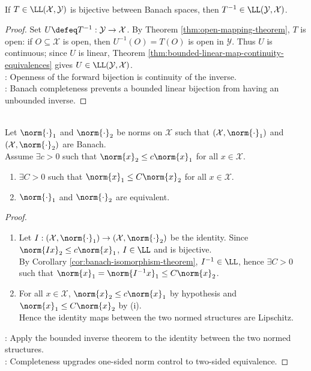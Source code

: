 \begin{corollary} \label{cor:banach-isomorphism-theorem} \\
If $T\in\LL(\mathcal{X},\mathcal{Y})$ is bijective between Banach spaces, then $T^{-1}\in\LL(\mathcal{Y},\mathcal{X})$.
\begin{proof}
Set $U\defeq T^{-1}:\mathcal Y\to\mathcal X$. By Theorem \ref{thm:open-mapping-theorem}, $T$ is open: if $O\subseteq\mathcal X$ is open, then $U^{-1}(O)=T(O)$ is open in $\mathcal Y$. Thus $U$ is continuous; since $U$ is linear, Theorem \ref{thm:bounded-linear-map-continuity-equivalences} gives $U\in\LL(\mathcal Y,\mathcal X)$.\\
: Openness of the forward bijection is continuity of the inverse.\\
: Banach completeness prevents a bounded linear bijection from having an unbounded inverse.
\end{proof}
\end{corollary}

\begin{corollary} \label{cor:banach-equivalent-norms-one-sided} \\
Let $\norm{\cdot}_1$ and $\norm{\cdot}_2$ be norms on $\mathcal X$ such that $(\mathcal X,\norm{\cdot}_1)$ and $(\mathcal X,\norm{\cdot}_2)$ are Banach.\\
Assume $\exists c>0$ such that $\norm{x}_2\leq c\norm{x}_1$ for all $x\in\mathcal X$.
\begin{enumerate}[label=(\roman*)]
\setlength{\itemsep}{0pt}
\item $\exists C>0$ such that $\norm{x}_1\leq C\norm{x}_2$ for all $x\in\mathcal X$.
\item $\norm{\cdot}_1$ and $\norm{\cdot}_2$ are equivalent.
\end{enumerate}
\begin{proof}
\begin{enumerate}[label=(\roman*)]
\setlength{\itemsep}{0pt}
\item Let $I:(\mathcal X,\norm{\cdot}_1)\to(\mathcal X,\norm{\cdot}_2)$ be the identity. Since $\norm{Ix}_2\leq c\norm{x}_1$, $I\in\LL$ and is bijective.\\
By Corollary \ref{cor:banach-isomorphism-theorem}, $I^{-1}\in\LL$, hence $\exists C>0$ such that $\norm{x}_1=\norm{I^{-1}x}_1\leq C\norm{x}_2$.
\item For all $x\in\mathcal X$, $\norm{x}_2\leq c\norm{x}_1$ by hypothesis and $\norm{x}_1\leq C\norm{x}_2$ by (i).\\
Hence the identity maps between the two normed structures are Lipschitz.
\end{enumerate}
: Apply the bounded inverse theorem to the identity between the two normed structures.\\
: Completeness upgrades one-sided norm control to two-sided equivalence.
\end{proof}
\end{corollary}

